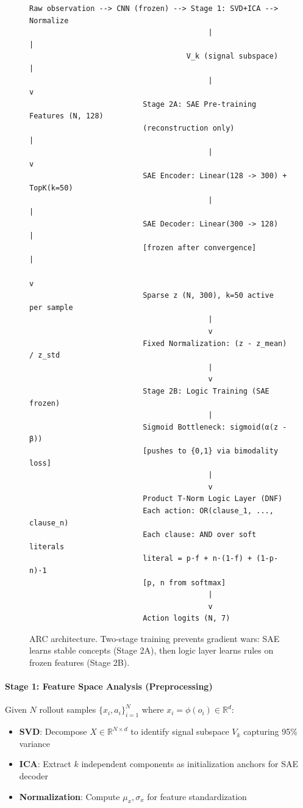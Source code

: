 \documentclass[11pt,twocolumn]{article}
\begin{document}
\begin{figure}
\centering
\small
\begin{verbatim}
Raw observation --> CNN (frozen) --> Stage 1: SVD+ICA --> Normalize
                                         |                    |
                                    V_k (signal subspace)     |
                                         |                    v
                          Stage 2A: SAE Pre-training    Features (N, 128)
                          (reconstruction only)              |
                                         |                    v
                          SAE Encoder: Linear(128 -> 300) + TopK(k=50)
                                         |                    |
                          SAE Decoder: Linear(300 -> 128)    |
                          [frozen after convergence]          |
                                                              v
                          Sparse z (N, 300), k=50 active per sample
                                         |
                                         v
                          Fixed Normalization: (z - z_mean) / z_std
                                         |
                                         v
                          Stage 2B: Logic Training (SAE frozen)
                                         |
                          Sigmoid Bottleneck: sigmoid(α(z - β))
                          [pushes to {0,1} via bimodality loss]
                                         |
                                         v
                          Product T-Norm Logic Layer (DNF)
                          Each action: OR(clause_1, ..., clause_n)
                          Each clause: AND over soft literals
                          literal = p·f + n·(1-f) + (1-p-n)·1
                          [p, n from softmax]
                                         |
                                         v
                          Action logits (N, 7)
\end{verbatim}
\caption{ARC architecture. Two-stage training prevents gradient wars: SAE learns stable concepts (Stage 2A), then logic layer learns rules on frozen features (Stage 2B).}
\label{fig:architecture}
\end{figure}

\paragraph{Stage 1: Feature Space Analysis (Preprocessing)}
Given $N$ rollout samples $\{x_i, a_i\}_{i=1}^N$ where $x_i = \phi(o_i) \in \mathbb{R}^d$:
\begin{itemize}
\item \textbf{SVD}: Decompose $X \in \mathbb{R}^{N \times d}$ to identify signal subspace $V_k$ capturing 95\% variance
\item \textbf{ICA}: Extract $k$ independent components as initialization anchors for SAE decoder
\item \textbf{Normalization}: Compute $\mu_x, \sigma_x$ for feature standardization
\end{itemize}
\end{document}
